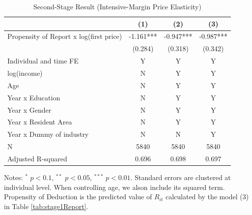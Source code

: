 \documentclass[
  11pt,
  a4paper,
]{article}
\begin{document}
\begin{table}

\caption{\label{tab:IntensiveReport}Second-Stage Result (Intensive-Margin Price Elasticity)}
\centering
\fontsize{9}{11}\selectfont
\begin{threeparttable}
\begin{tabular}[t]{lccc}
\toprule
 & (1) & (2) & (3)\\
\midrule
Propensity of Report x log(first price) & -1.161*** & -0.947*** & -0.987***\\
 & (0.284) & (0.318) & (0.342)\\
Individual and time FE & Y & Y & Y\\
log(income) & N & Y & Y\\
Age & N & Y & Y\\
Year x Education & N & Y & Y\\
Year x Gender & N & Y & Y\\
Year x Resident Area & N & Y & Y\\
Year x Dummy of industry & N & N & Y\\
N & 5840 & 5840 & 5840\\
Adjusted R-squared & 0.696 & 0.698 & 0.697\\
\bottomrule
\end{tabular}
\begin{tablenotes}
\item Notes: $^{*}$ $p < 0.1$, $^{**}$ $p < 0.05$, $^{***}$ $p < 0.01$. Standard errors are clustered at individual level. When controlling age, we alson include its squared term. Propensity of Deduction is the predicted value of $R_{it}$ calculated by the model (3) in Table \ref{tab:stage1Report}.
\end{tablenotes}
\end{threeparttable}
\end{table}
\end{document}
